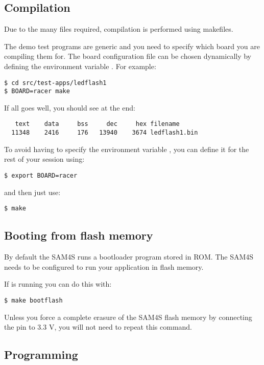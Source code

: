 \subsection{Compilation}
\label{compilation}

Due to the many files required, compilation is performed using
makefiles.

The demo test programs are generic and you need to specify which board
you are compiling them for. The board configuration file can be chosen
dynamically by defining the environment variable . For
example:
%
\begin{verbatim}
$ cd src/test-apps/ledflash1
$ BOARD=racer make
\end{verbatim}

If all goes well, you should see at the end:
%
\begin{verbatim}
   text    data     bss     dec     hex filename
  11348	   2416	    176	  13940	   3674	ledflash1.bin
\end{verbatim}

To avoid having to specify the environment variable , you
can define it for the rest of your session using:
%
\begin{verbatim}
$ export BOARD=racer
\end{verbatim}
%
and then just use:
%
\begin{verbatim}
$ make
\end{verbatim}

\subsection{Booting from flash memory}
\label{booting-from-flash-memory}

By default the SAM4S runs a bootloader program stored in ROM. The SAM4S
needs to be configured to run your application in flash memory.

If  is running you can do this with:

\begin{verbatim}
$ make bootflash
\end{verbatim}

Unless you force a complete erasure of the SAM4S flash memory by
connecting the  pin to 3.3 V, you will not need to repeat
this command.

\subsection{Programming}
\label{programming}


